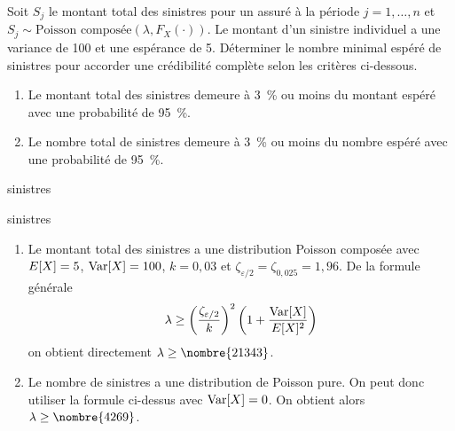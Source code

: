 \begin{exercice}
  Soit $S_{j}$ le montant total des sinistres pour un assuré à la
  période $j = 1, \dots, n$ et $S_{j} \sim \text{Poisson
    composée}(\lambda, F_X(\cdot))$. Le montant d'un sinistre
  individuel a une variance de 100 et une espérance de 5. Déterminer
  le nombre minimal espéré de sinistres pour accorder une crédibilité
  complète selon les critères ci-dessous.
  \begin{enumerate}
  \item Le montant total des sinistres demeure à 3~\% ou moins du
    montant espéré avec une probabilité de 95~\%.
  \item Le nombre total de sinistres demeure à 3~\% ou moins du nombre
    espéré avec une probabilité de 95~\%.
  \end{enumerate}
  \begin{rep}
    \begin{inparaenum}
    \item {} sinistres
    \item {} sinistres
    \end{inparaenum}
  \end{rep}
  \begin{sol}
    \begin{enumerate}
    \item Le montant total des sinistres a une distribution Poisson
      composée avec $E [ X ] = 5$, $\operatorname{Var} [ X ] = 100$, $k = 0,03$ et
      $\zeta_{\varepsilon/2} = \zeta_{0,025} = 1,96$. De la formule générale
      \begin{displaymath}
        \lambda \ge
        \left(
          \frac{\zeta_{\varepsilon/2}}{k}
        \right)^2
        \left(
          1 + \frac{\operatorname{Var} [ X ]}{E [ X ]^2}
        \right)
      \end{displaymath}
      on obtient directement $\lambda \geq \nombre{21343}$.
    \item Le nombre de sinistres a une distribution de Poisson pure.
      On peut donc utiliser la formule ci-dessus avec $\operatorname{Var} [ X ] = 0$. On
      obtient alors $\lambda \geq \nombre{4269}$.
    \end{enumerate}
  \end{sol}
\end{exercice}

